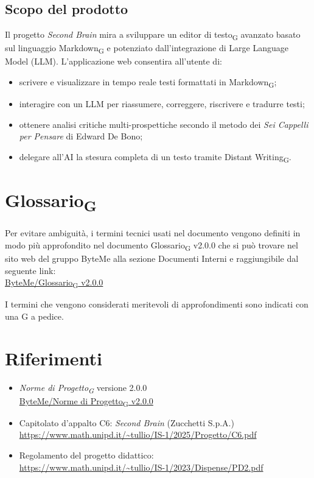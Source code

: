 \documentclass[11pt,a4paper]{article}
\newcommand{\gls}[1]{#1\textsubscript{G}}
\begin{document}
\subsection{Scopo del prodotto}
Il progetto \textit{Second Brain} mira a sviluppare un \gls{editor di testo} avanzato basato sul linguaggio \gls{Markdown} e potenziato dall'integrazione di Large Language Model (LLM).
L'applicazione web consentira all'utente di:
\begin{itemize}
  \item scrivere e visualizzare in tempo reale testi formattati in \gls{Markdown};
  \item interagire con un LLM per riassumere, correggere, riscrivere e tradurre testi;
  \item ottenere analisi critiche multi-prospettiche secondo il metodo dei \textit{Sei Cappelli per Pensare} di Edward De Bono;
  \item delegare all'AI la stesura completa di un testo tramite \gls{Distant Writing}.
\end{itemize}
 
\section{\gls{Glossario}}
Per evitare ambiguità, i termini tecnici usati nel documento vengono definiti in modo più approfondito nel documento \gls{Glossario} v2.0.0 che si può trovare nel sito web del gruppo ByteMe alla sezione Documenti Interni e raggiungibile dal seguente link:\\
\href{https://byteme25.github.io/ByteMe/files.html}{ByteMe/\gls{Glossario} v2.0.0}

I termini che vengono considerati meritevoli di approfondimenti sono indicati con una G a pedice.


\section{Riferimenti}
\begin{itemize}
  \item \textit{\gls{Norme di Progetto}} versione 2.0.0\\
  \href{https://byteme25.github.io/ByteMe/files.html}{ByteMe/\gls{Norme di Progetto} v2.0.0}
  \item Capitolato d'appalto C6: \textit{Second Brain} (Zucchetti S.p.A.)\\ \url{https://www.math.unipd.it/~tullio/IS-1/2025/Progetto/C6.pdf}
  \item Regolamento del progetto didattico:\\
        \url{https://www.math.unipd.it/~tullio/IS-1/2023/Dispense/PD2.pdf}
\end{itemize}
 
\end{document}
